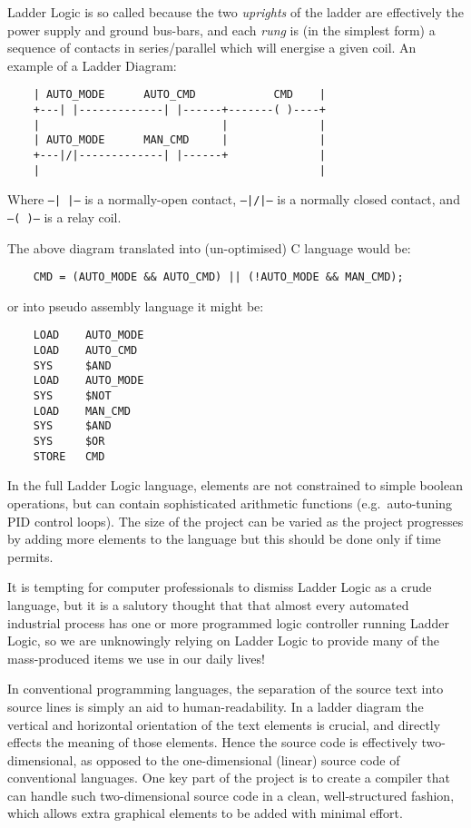 \documentclass[12pt]{article}
\begin{document}
Ladder Logic is so called because the two \emph{uprights\/} of the
ladder are effectively the power supply and ground bus-bars, and each
\emph{rung\/} is (in the simplest form) a sequence of contacts in
series/parallel which will energise a given coil. An example of a
Ladder Diagram:

\begin{verbatim}
    | AUTO_MODE      AUTO_CMD            CMD    |
    +---| |-------------| |------+-------( )----+
    |                            |              |
    | AUTO_MODE      MAN_CMD     |              |
    +---|/|-------------| |------+              |
    |                                           |
\end{verbatim}

Where {\tt --| |--} is a normally-open contact, {\tt --|/|--} is a
normally closed contact, and {\tt --(~)--} is a relay coil.

The above diagram translated into (un-optimised) C language would be:

\begin{verbatim}
    CMD = (AUTO_MODE && AUTO_CMD) || (!AUTO_MODE && MAN_CMD);
\end{verbatim}

or into pseudo assembly language it might be:

\begin{verbatim}
    LOAD    AUTO_MODE
    LOAD    AUTO_CMD
    SYS     $AND
    LOAD    AUTO_MODE
    SYS     $NOT
    LOAD    MAN_CMD
    SYS     $AND
    SYS     $OR
    STORE   CMD
\end{verbatim}

In the full Ladder Logic language, elements are not constrained to
simple boolean operations, but can contain sophisticated arithmetic
functions (e.g.\ auto-tuning PID control loops). The size of the
project can be varied as the project progresses by adding more
elements to the language but this should be done only if time permits.

It is tempting for computer professionals to dismiss Ladder Logic as a
crude language, but it is a salutory thought that that almost every
automated industrial process has one or more programmed logic
controller running Ladder Logic, so we are unknowingly relying on
Ladder Logic to provide many of the mass-produced items we use in our
daily lives!

In conventional programming languages, the separation of the source
text into source lines is simply an aid to human-readability. In a
ladder diagram the vertical and horizontal orientation of the text
elements is crucial, and directly effects the meaning of those
elements. Hence the source code is effectively two-dimensional, as
opposed to the one-dimensional (linear) source code of conventional
languages. One key part of the project is to create a compiler that
can handle such two-dimensional source code in a clean,
well-structured fashion, which allows extra graphical elements to be
added with minimal effort.
\end{document}
